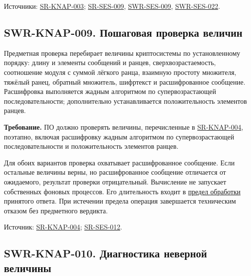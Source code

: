 \documentclass[12pt,a4paper]{article}
\begin{document}
Источники: {\href{../04\_Системные\_требования/DOC-05\_Системные\_требования.pdf\#sr-knap-003}{SR-KNAP-003}}; {\href{../04\_Системные\_требования/DOC-05\_Системные\_требования.pdf\#sr-ses-009}{SR-SES-009}}, {\href{DOC-06.2\_Сессии\_задач\_и\_планировщик.pdf\#swr-ses-009}{SWR-SES-009}}, {\href{DOC-06.2\_Сессии\_задач\_и\_планировщик.pdf\#swr-ses-022}{SWR-SES-022}}.

\subsection{SWR-KNAP-009. Пошаговая проверка величин}\label{swr-knap-009-ux43fux43eux448ux430ux433ux43eux432ux430ux44f-ux43fux440ux43eux432ux435ux440ux43aux430-ux432ux435ux43bux438ux447ux438ux43d}

\hypertarget{swr-knap-009-пошаговая-проверка-величин}{}

\hypertarget{swr-knap-009}{}

Предметная проверка перебирает величины криптосистемы по установленному порядку: длину и элементы сообщений и ранцев, сверхвозрастаемость, соотношение модуля с суммой лёгкого ранца, взаимную простоту множителя, тяжёлый ранец, обратный множитель, шифртекст и расшифрованное сообщение. Расшифровка выполняется жадным алгоритмом по супервозрастающей последовательности; дополнительно устанавливается положительность элементов ранцев.

\textbf{Требование.} ПО должно проверять величины, перечисленные в {\href{../04\_Системные\_требования/DOC-05\_Системные\_требования.pdf\#sr-knap-004}{SR-KNAP-004}}, поэтапно, включая расшифровку жадным алгоритмом по супервозрастающей последовательности и положительность элементов ранцев.

Для обоих вариантов проверка охватывает расшифрованное сообщение. Если остальные величины верны, но расшифрованное сообщение отличается от ожидаемого, результат проверки отрицательный. Вычисление не запускает собственных фоновых процессов. Его длительность входит в {\href{DOC-06.2\_Сессии\_задач\_и\_планировщик.pdf\#swr-ses-020-предел-обработки}{предел обработки}} принятого ответа. При истечении предела операция завершается техническим отказом без предметного вердикта.

Источник: {\href{../04\_Системные\_требования/DOC-05\_Системные\_требования.pdf\#sr-knap-004}{SR-KNAP-004}}; {\href{../04\_Системные\_требования/DOC-05\_Системные\_требования.pdf\#sr-ses-012}{SR-SES-012}}.

\subsection{SWR-KNAP-010. Диагностика неверной величины}\label{swr-knap-010-ux434ux438ux430ux433ux43dux43eux441ux442ux438ux43aux430-ux43dux435ux432ux435ux440ux43dux43eux439-ux432ux435ux43bux438ux447ux438ux43dux44b}
\end{document}
